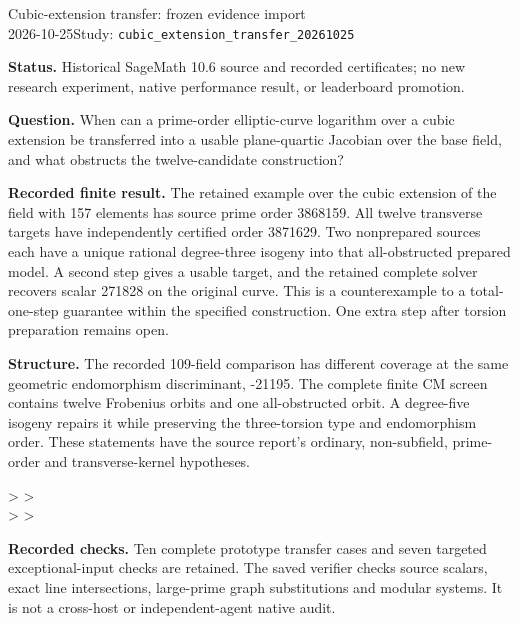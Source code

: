 \documentclass[10pt]{article}
\begin{document}
\begin{center}
{\Large Cubic-extension transfer: frozen evidence import}\\[5pt]
2026-10-25\quad Study: \texttt{cubic\_extension\_transfer\_20261025}
\end{center}

\textbf{Status.} Historical SageMath 10.6 source and recorded certificates;
no new research experiment, native performance result, or leaderboard promotion.

\textbf{Question.} When can a prime-order elliptic-curve logarithm over a cubic
extension be transferred into a usable plane-quartic Jacobian over the base
field, and what obstructs the twelve-candidate construction?

\textbf{Recorded finite result.} The retained example over the cubic extension
of the field with 157 elements has source prime order 3868159. All twelve
transverse targets have independently certified order 3871629. Two
nonprepared sources each have a unique rational degree-three isogeny into
that all-obstructed prepared model. A second step gives a usable target, and
the retained complete solver recovers scalar 271828 on the original curve.
This is a counterexample to a total-one-step guarantee within the specified
construction. One extra step after torsion preparation remains open.

\textbf{Structure.} The recorded 109-field comparison has different coverage
at the same geometric endomorphism discriminant, -21195. The complete finite
CM screen contains twelve Frobenius orbits and one all-obstructed orbit. A
degree-five isogeny repairs it while preserving the three-torsion type and
endomorphism order. These statements have the source report's ordinary,
non-subfield, prime-order and transverse-kernel hypotheses.

\begin{center}
\quad\textgreater\quad
{}\quad\textgreater\quad
{}\\[8pt]
\quad\textgreater\quad
{}\quad\textgreater\quad
{}
\end{center}

\textbf{Recorded checks.} Ten complete prototype transfer cases and seven
targeted exceptional-input checks are retained. The saved verifier checks
source scalars, exact line intersections, large-prime graph substitutions
and modular systems. It is not a cross-host or independent-agent native audit.
\end{document}
